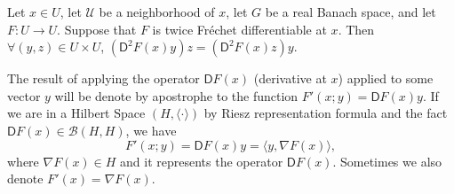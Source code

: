 \begin{fact}[]
	Let $x \in U$, let $\mathcal{U}$ be a neighborhood of $x$, let $G$ be a real Banach
	space, and let $F: U \rightarrow U$. Suppose that $F$ is twice Fr\'echet differentiable at $x$.
	Then $\forall (y,z) \in U \times U$,  $(\mathsf{D}^2 F (x)y)z = (\mathsf{D}^2 F (x)z)y$.
\end{fact}

\begin{remark}[Notation]
	The result of applying the operator $\mathsf{D}F(x)$ (derivative at $x$) applied to some vector $y$ will be denote by apostrophe to the function $F'(x; y)=\mathsf{D}F(x)y$. If we are in a Hilbert Space $(H, \langle \cdot \rangle)$ by Riesz representation formula and the fact $\mathsf{D}F(x) \in \mathcal{B}(H,H)$, we have
	\[
		F'(x; y)=\mathsf{D}F(x)y=\langle y, \nabla F(x) \rangle,
	\]
where $\nabla F(x) \in H$ and it represents the operator $\mathsf{D}F(x)$. Sometimes we also denote $F'(x)=\nabla F(x)$.
\end{remark}

